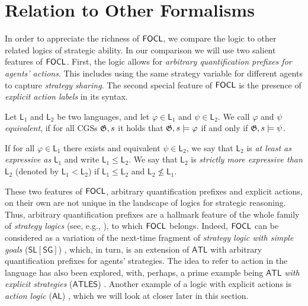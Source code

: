 \documentclass[sigconf,anonymous]{aamas}
\begin{document}

   

\section{Relation to Other Formalisms}
\label{sec:expressivity}
In order to appreciate the richness of $\mathsf{FOCL}$, we compare the logic to other related logics of strategic ability. In our comparison we will use two salient features of $\mathsf{FOCL}$. First, the logic allows for \textit{arbitrary quantification prefixes for agents' actions}. This includes using the same strategy variable for different agents to capture \textit{strategy sharing}. The second special feature of $\mathsf{FOCL}$ is the presence of \textit{explicit action labels} in its syntax.

\begin{definition}
    Let $\mathsf{L}_1$ and $\mathsf{L}_2$ be two languages, and let $\varphi \in \mathsf{L}_1$ and $\psi \in \mathsf{L}_2$. We call $\varphi$ and $\psi$ \emph{equivalent}, if for all CGSs $\mathfrak{G},s$ it holds that $\mathfrak{G},s \models \varphi$ if and only if $\mathfrak{G}, s \models \psi$. 

    If for all $\varphi \in \mathsf{L}_1$ there exists and equivalent $\psi \in \mathsf{L}_2$, we say that $\mathsf{L}_2$ is \emph{at least as expressive as } $\mathsf{L}_1$ and write $\mathsf{L}_1 \leqslant \mathsf{L}_2$. We say that $\mathsf{L}_2$ is \emph{strictly more expressive than } $\mathsf{L}_2$ (denoted by $\mathsf{L}_1 < \mathsf{L}_2$) if $\mathsf{L}_1 \leqslant \mathsf{L}_2$ and $\mathsf{L}_2 \not \leqslant \mathsf{L}_1$.
\end{definition}

These two features of $\mathsf{FOCL}$, arbitrary quantification prefixes and explicit actions, on their own are not unique in the landscape of logics for strategic reasoning. Thus, arbitrary quantification prefixes are a hallmark feature of the whole family of \textit{strategy logics} (see, e.g., \cite{mogavero10,belardinelli19}), to which $\mathsf{FOCL}$ belongs. Indeed, $\mathsf{FOCL}$ can be considered as a variation of the next-time fragment of \textit{strategy logic with simple goals} ($\mathsf{SL[SG]}$) \cite{belardinelli19}, which, in turn, is an extension of $\mathsf{ATL}$ \cite{alur02} with arbitrary quantification prefixes for agents' strategies. The idea to refer to action in the language has also been explored, with, perhaps, a prime example being $\mathsf{ATL}$ \textit{with explicit strategies} ($\mathsf{ATLES}$) \cite{walther07}. Another example of a logic with explicit actions is \textit{action logic} ($\mathsf{AL}$) \cite{borgo07}, which we will look at closer later in this section.
\end{document}
